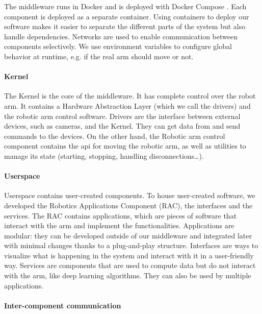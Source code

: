 The middleware runs in Docker \cite{docker} and is deployed with Docker Compose \cite{docker-compose}. Each component is deployed as a separate container. Using containers to deploy our software makes it easier to separate the different parts of the system but also handle dependencies. Networks are used to enable communication between components selectively. We use environment variables to configure global behavior at runtime, e.g. if the real arm should move or not.

\paragraph{Kernel}

The Kernel is the core of the middleware. It has complete control over the robot arm. It contains a Hardware Abstraction Layer (which we call the drivers) and the robotic arm control software. Drivers are the interface between external devices, such as cameras, and the Kernel. They can get data from and send commands to the devices. On the other hand, the Robotic arm control component contains the \gls{api} for moving the robotic arm, as well as utilities to manage its state (starting, stopping, handling disconnections\dots).

\paragraph{Userspace}

Userspace contains user-created components. To house user-created software, we developed the Robotics Applications Component (RAC), the interfaces and the services. The RAC contains applications, which are pieces of software that interact with the arm and implement the functionalities. Applications are modular: they can be developed outside of our middleware and integrated later with minimal changes thanks to a plug-and-play structure. Interfaces are ways to visualize what is happening in the system and interact with it in a user-friendly way. Services are components that are used to compute data but do not interact with the arm, like deep learning algorithms. They can also be used by multiple applications.

\paragraph{Inter-component communication}

